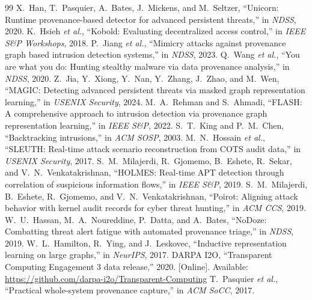 \documentclass[conference]{IEEEtran}
\begin{document}
\begin{thebibliography}{99}
 X.~Han, T.~Pasquier, A.~Bates, J.~Mickens, and
M.~Seltzer, ``Unicorn: Runtime provenance-based detector for advanced
persistent threats,'' in \emph{NDSS}, 2020.
 K.~Hsieh \emph{et al.}, ``Kobold: Evaluating
decentralized access control,'' in \emph{IEEE S\&P Workshops}, 2018.
 P.~Jiang \emph{et al.}, ``Mimicry attacks against
provenance graph based intrusion detection systems,'' in \emph{NDSS}, 2023.
 Q.~Wang \emph{et al.}, ``You are what you do: Hunting
stealthy malware via data provenance analysis,'' in \emph{NDSS}, 2020.
 Z.~Jia, Y.~Xiong, Y.~Nan, Y.~Zhang, J.~Zhao, and
M.~Wen, ``MAGIC: Detecting advanced persistent threats via masked graph
representation learning,'' in \emph{USENIX Security}, 2024.
 M.~A.~Rehman and S.~Ahmadi, ``FLASH: A comprehensive
approach to intrusion detection via provenance graph representation learning,''
in \emph{IEEE S\&P}, 2022.
 S.~T.~King and P.~M.~Chen, ``Backtracking
intrusions,'' in \emph{ACM SOSP}, 2003.
 M.~N.~Hossain \emph{et al.}, ``SLEUTH: Real-time
attack scenario reconstruction from COTS audit data,'' in \emph{USENIX
Security}, 2017.
 S.~M.~Milajerdi, R.~Gjomemo, B.~Eshete,
R.~Sekar, and V.~N.~Venkatakrishnan, ``HOLMES: Real-time APT detection through
correlation of suspicious information flows,'' in \emph{IEEE S\&P}, 2019.
 S.~M.~Milajerdi, B.~Eshete, R.~Gjomemo, and
V.~N.~Venkatakrishnan, ``Poirot: Aligning attack behavior with kernel audit
records for cyber threat hunting,'' in \emph{ACM CCS}, 2019.
 W.~U.~Hassan, M.~A.~Noureddine, P.~Datta, and
A.~Bates, ``NoDoze: Combatting threat alert fatigue with automated provenance
triage,'' in \emph{NDSS}, 2019.
 W.~L.~Hamilton, R.~Ying, and J.~Leskovec,
``Inductive representation learning on large graphs,'' in \emph{NeurIPS}, 2017.
 DARPA I2O, ``Transparent Computing Engagement 3 data
release,'' 2020. [Online]. Available:
\url{https://github.com/darpa-i2o/Transparent-Computing}
 T.~Pasquier \emph{et al.}, ``Practical
whole-system provenance capture,'' in \emph{ACM SoCC}, 2017.
\end{thebibliography}
\end{document}
